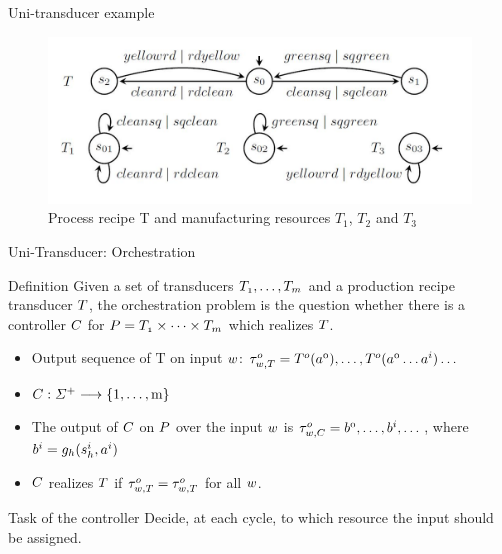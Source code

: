\documentclass{beamer}
\theoremstyle{definition}
\theoremstyle{plain}
\begin{document}
\begin{frame}{Uni-transducer example}
\begin{figure}[htp]
\centering
\includegraphics[width=\linewidth]{images/ex1trans.JPG}
\caption{Process recipe T and manufacturing resources $T_{1}$, $T_{2}$ and $T_{3}$}
\label{fig:ex1trans}
\end{figure}

\end{frame}
\begin{frame}{Uni-Transducer: Orchestration}
\begin{alertblock}{Definition}
Given a set of transducers $\mathnormal{T_{1},\dots,T_{m}}$ and a
production recipe transducer $\mathnormal{T}$, the orchestration problem
is the question whether there is a controller $\mathnormal{C}$ for $\mathnormal{P = T_{1} \times \dots \times T_{m}}$ which realizes $\mathnormal{T}$.
\end{alertblock}
\begin{itemize}
    \item Output sequence of $\mathrm{T}$ on input $\mathnormal{w}$: $\mathnormal{\tau^{o}_{w,T} = T^{o}(a^{0})},\dots,\mathnormal{T^{o}(a^{0}}\dots\mathnormal{a^{i})}\dots$
    \item $\mathnormal{C : \Sigma^{+}} \longrightarrow \mathrm{\{1,\dots,m\}}$
    \item The output of $\mathnormal{C}$ on $\mathnormal{P}$ over the input $\mathnormal{w}$ is $\mathnormal{\tau^{o}_{w,C} = b^{0},\dots,b^{i}},\dots$, where $\mathnormal{b^{i} = g_{h}(s^{i}_{h},a^{i})}$
    \item $\mathnormal{C}$ realizes $\mathnormal{T}$ if  $\mathnormal{\tau^{o}_{w,T} = \tau^{o}_{w,T}}$ for all $\mathnormal{w}$.
\end{itemize}
\begin{block}{Task of the controller}
Decide, at each cycle, to which resource the input should be assigned.
\end{block}    
\end{frame}
\end{document}
